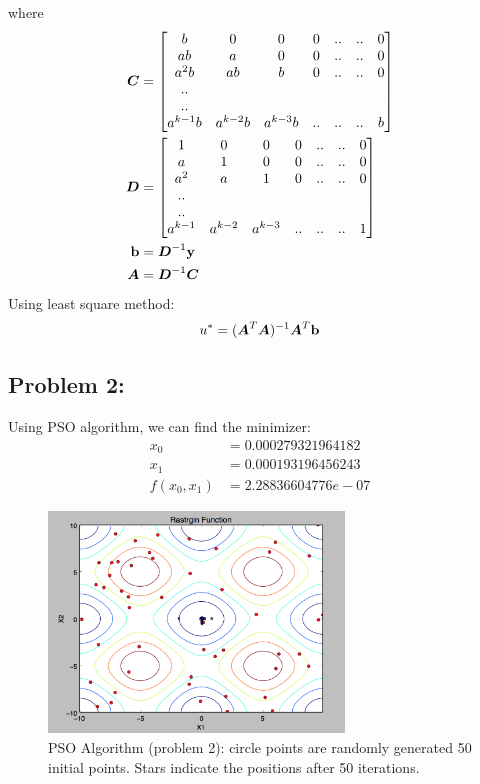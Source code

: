 \documentclass{article}
\begin{document}
where \begin{align*}  
\boldsymbol{C} &= \begin{bmatrix} b& 0& 0& 0& ..& ..& 0 \\ab& a& 0& 0& ..& ..& 0 \\a^2 b& ab& b& 0& ..& ..& 0\\ .. \\ .. \\ a^{k-1}b& a^{k-2}b& a^{k-3}b& ..& ..& ..& b   \end{bmatrix}\\
\boldsymbol{D} & = \begin{bmatrix} 1& 0& 0& 0& ..& ..& 0 \\a& 1& 0& 0& ..& ..& 0 \\a^2& a& 1& 0& ..& ..& 0 \\ .. \\ .. \\  a^{k-1}& a^{k-2} & a^{k-3} & ..& ..& ..&  1  \end{bmatrix}\\
\boldsymbol{\mathrm{b}} &= \boldsymbol{D}^{-1}\boldsymbol{\mathrm{y}}\\
\boldsymbol{A} & = \boldsymbol{D}^{-1}\boldsymbol{C}
\end{align*}
Using least square method: \begin{align*} 
u^{*} = (\boldsymbol{A}^{T}\boldsymbol{A})^{-1}\boldsymbol{A}^T\boldsymbol{\mathrm{b}} 
\end{align*}


\subsection*{{Problem 2: }}

Using PSO algorithm, we can find the minimizer: \\
\begin{align*}
x_0 & = 0.000279321964182 \\
x_1 & = 0.000193196456243 \\
f(x_0,x_1) & =  2.28836604776e-07
\end{align*}

\begin{figure}[h]
\includegraphics[width=0.7\textwidth]{PSO} 
\centering
\caption{PSO Algorithm (problem 2): circle points are randomly generated 50 initial points. Stars indicate the positions after 50 iterations. }

\end{figure}
\end{document}
